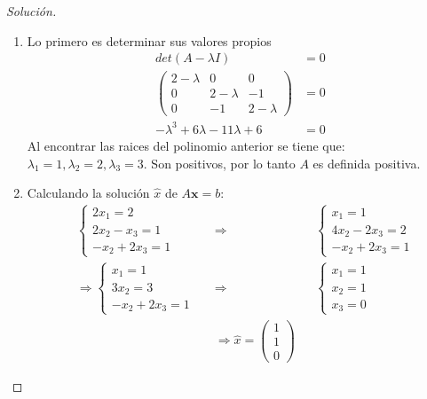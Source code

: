 \documentclass[12pt]{book}
\newenvironment{solucion}
  {\renewcommand\qedsymbol{$\square$}\begin{proof}[Solución]}
  {\end{proof}}
\begin{document}
\begin{solucion}
\renewcommand{\labelenumi}{(\alph{enumi})}
\begin{enumerate}
    \item Lo primero es determinar sus valores propios
    \begin{align*}
        det(A-\lambda I)&=0\\
        \begin{pmatrix}
        2-\lambda&0&0\\
        0&2-\lambda&-1\\
        0&-1&2-\lambda
        \end{pmatrix}&=0\\
        -\lambda^3+6\lambda-11\lambda+6&=0
    \end{align*}
    Al encontrar las raices del polinomio anterior se tiene que: $\lambda_1=1,\lambda_2=2,\lambda_3=3$. Son positivos, por lo tanto $A$ es definida positiva.
    \item Calculando la solución $\hat{x}$ de $A\bm{x}=b$:
    \begin{align*}
        &\begin{cases*}
        2x_1=2\\
        2x_2-x_3=1\\
        -x_2+2x_3=1
        \end{cases*}& &\Rightarrow & &\begin{cases*}
        x_1=1\\
        4x_2-2x_3=2\\
        -x_2+2x_3=1
        \end{cases*}\\&\Rightarrow\begin{cases*}
        x_1=1\\
        3x_2=3\\
        -x_2+2x_3=1
        \end{cases*} & &\Rightarrow&&\begin{cases*}
        x_1=1\\
        x_2=1\\
        x_3=0
        \end{cases*}\\
        && &\Rightarrow\hat{x}=\begin{pmatrix}
        1\\
        1\\
        0
        \end{pmatrix} &&
    \end{align*}
\end{enumerate}
\end{solucion}
\end{document}

